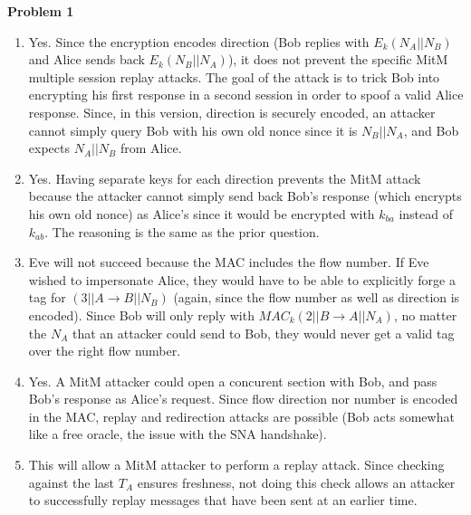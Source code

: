 \documentclass{article}
\begin{document}
\textbf{Problem 1}
\begin{enumerate}
	\item Yes. Since the encryption encodes direction (Bob replies with $E_k(N_A||N_B)$ and Alice sends back $E_k(N_B||N_A)$), it does not prevent the specific MitM multiple session replay attacks. The goal of the attack is to trick Bob into encrypting his first response in a second session in order to spoof a valid Alice response. Since, in this version, direction is securely encoded, an attacker cannot simply query Bob with his own old nonce since it is $N_B||N_A$, and Bob expects $N_A||N_B$ from Alice.
	\item Yes. Having separate keys for each direction prevents the MitM attack because the attacker cannot simply send back Bob's response (which encrypts his own old nonce) as Alice's since it would be encrypted with $k_{ba}$ instead of $k_{ab}$. The reasoning is the same as the prior question.
	\item Eve will not succeed because the MAC includes the flow number. If Eve wished to impersonate Alice, they would have to be able to explicitly forge a tag for $(3||A\rightarrow B||N_B)$ (again, since the flow number as well as direction is encoded). Since Bob will only reply with $MAC_k(2||B\rightarrow A||N_A)$, no matter the $N_A$ that an attacker could send to Bob, they would never get a valid tag over the right flow number.
	\item Yes. A MitM attacker could open a concurent section with Bob, and pass Bob's response as Alice's request. Since flow direction nor number is encoded in the MAC, replay and redirection attacks are possible (Bob acts somewhat like a free oracle, the issue with the SNA handshake).
	\item This will allow a MitM attacker to perform a replay attack. Since checking against the last $T_A$ ensures freshness, not doing this check allows an attacker to successfully replay messages that have been sent at an earlier time.
\end{enumerate}
\end{document}
